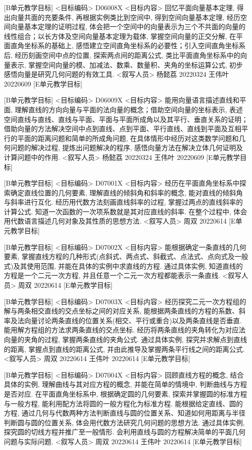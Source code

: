 \documentclass[10pt,a4paper]{article}
\begin{document}
[B单元教学目标]
<目标编码>
D06008X
<目标内容>
回忆平面向量基本定理, 得出向量共面的充要条件, 再根据实例类比到空间中, 得到空间向量基本定理, 经历空间向量基本定理的证明过程, 体会把一个空间中的向量表示为三个不共面的向量的线性组合；以长方体及空间向量基本定理为载体, 掌握空间向量的正交分解, 在平面直角坐标系的基础上, 感悟建立空间直角坐标系的必要性；引入空间直角坐标系后, 经历刻画空间中点的位置, 探索两点间的距离公式, 类比平面直角坐标系中的向量表示, 掌握空间向量的模、加减法、数乘、数量积、夹角的坐标运算公式, 初步感悟向量是研究几何问题的有效工具.
<叙写人员>
杨懿荔  20220324
王伟叶  20220609
[E单元教学目标]




[B单元教学目标]
<目标编码>
D06009X
<目标内容>
能用向量语言描述直线和平面, 理解直线的方向向量与平面的法向量的概念；借助空间向量的坐标表示, 表述空间直线与直线、直线与平面、平面与平面所成角以及其平行、垂直关系的证明；借助向量的方法解决空间中点到直线、点到平面、平行直线、直线到平面及互相平行的平面的距离问题和简单的所成角问题, 在具体情形中经历对这类数学问题和几何问题的解决过程, 提炼出问题解决的程序, 感悟向量方法在解决立体几何证明及计算问题中的作用.
<叙写人员>
杨懿荔  20220324
王伟叶  20220609
[E单元教学目标]

[B单元教学目标]
<目标编码>
D07001X
<目标内容>
经历在平面直角坐标系中探索确定直线位置的几何要素, 理解直线的倾斜角和斜率的概念, 能对直线的倾斜角与斜率进行互化. 经历用代数方法刻画直线斜率的过程, 掌握过两点的直线斜率的计算公式. 知道一次函数的一次项系数就是其对应直线的斜率. 在整个过程中, 体会用代数语言描述几何对象及其性质的思想方法.
<叙写人员>
周双    20220614
[E单元教学目标]

[B单元教学目标]
<目标编码>
D07002X
<目标内容>
能根据确定一条直线的几何要素, 掌握直线方程的几种形式(点斜式、两点式、斜截式、点法式、点向式及一般式)及其使用范围, 并能在具体的实例中求直线的方程. 通过具体实例, 知道直线的方程是一个二元一次方程, 并且任意一个二元一次方程都能表示一条直线.
<叙写人员>
周双    20220614
[E单元教学目标]

[B单元教学目标]
<目标编码>
D07003X
<目标内容>
经历探究二元一次方程组的解与两条相交直线的交点坐标之间的对应关系, 能根据两条直线的方程的系数、斜率及法向量讨论两条直线的位置关系(相交、平行或重合)以及两条直线是否垂直. 能用解方程组的方法求两条直线的交点坐标. 经历将两条直线的夹角转化为对应法向量的夹角的过程, 掌握两条直线的夹角公式. 通过具体实例, 探究并求解点到直线的距离, 掌握点到直线的距离公式, 并由此推导及掌握两条平行线之间的距离公式.
<叙写人员>
周双    20220614
王伟叶  20220614
[E单元教学目标]


[B单元教学目标]
<目标编码>
D07004X
<目标内容>
回顾直线方程的概念, 结合具体的实例, 理解曲线与其对应方程的概念, 并能在简单的情境中, 判断曲线与方程是否对应. 在平面直角坐标系中, 根据确定圆的几何要素, 探索并掌握圆的标准方程与一般方程, 能利用配方法将圆的一般方程化为标准方程. 能根据给定直线、圆的方程, 通过几何与代数两种方法判断直线与圆的位置关系、知道如何用距离与半径判断圆与圆的位置关系, 体会用代数方法研究几何问题的思想方法. 通过具体实例, 探究圆的切线方程并推广至一般情形. 会利用直线与圆的方程解决简单的平面几何问题与实际问题.
<叙写人员>
周双    20220614
王伟叶  20220614
[E单元教学目标]
\end{document}
